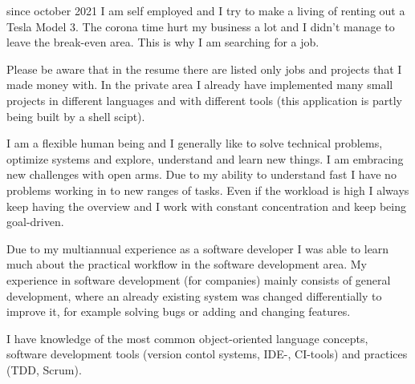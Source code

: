 \documentclass[fromphone,parskip=half]{scrlttr2}%
\newcommand\versionLanguageStart{}
\newcommand\versionLanguageEnd{}
\begin{document}
	\begin{letter}%
	{
		\addressReceiver
	}
		\opening{\joinList{\dear}{\genderReceiver}{\surnameReceiver}{,}}
\versionLanguageStart%
		since october 2021 I am self employed and I try to make a living of renting out a Tesla Model 3.
		The corona time hurt my business a lot and I didn't manage to leave the break-even area.
		This is why I am searching for a job.
\versionLanguageEnd
		
		
\versionLanguageStart%
		Please be aware that in the resume there are listed only jobs and projects that I made money with.
		In the private area I already have implemented many small projects in different languages and with different tools (this application is partly being built by a shell scipt).
\versionLanguageEnd

\versionLanguageStart%
		I am a flexible human being and I generally like to solve technical problems, optimize systems and explore, understand and learn new things.
		I am embracing new challenges with open arms.
		Due to my ability to understand fast I have no problems working in to new ranges of tasks.
		Even if the workload is high I always keep having the overview and I work with constant concentration and keep being goal-driven.
\versionLanguageEnd
		
\versionLanguageStart%
		Due to my multiannual experience as a software developer I was able to learn much about the practical workflow in the software development area.
		My experience in software development (for companies) mainly consists of general development, where an already existing system was changed differentially to improve it, for example solving bugs or adding and changing features.
\versionLanguageEnd

\versionLanguageStart%
		I have knowledge of the most common object-oriented language concepts, software development tools (version contol systems, IDE-, CI-tools) and practices (TDD, Scrum).
\versionLanguageEnd

%
%		
		

\end{letter}
\end{document}
